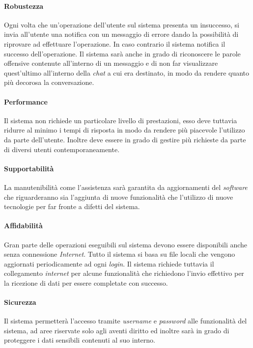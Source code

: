 \paragraph{Robustezza\\} 
Ogni volta che un’operazione dell’utente sul sistema presenta un insuccesso, si invia all’utente una notifica con un messaggio di errore dando la possibilità di riprovare ad effettuare l’operazione. In caso contrario il sistema notifica il successo dell’operazione. 
Il sistema sarà anche in grado di riconoscere le parole offensive contenute all’interno di un messaggio e di non far visualizzare quest’ultimo all’interno della \emph{chat} a cui era destinato, in modo da rendere quanto più decorosa la conversazione. 

\paragraph{Performance\\} 
Il sistema non richiede un particolare livello di prestazioni, esso deve tuttavia ridurre al minimo i tempi di risposta in modo da rendere più piacevole l’utilizzo da parte dell’utente. Inoltre deve essere in grado di gestire più richieste da parte di diversi utenti contemporaneamente.

\paragraph{Supportabilità\\} 
La manutenibilità come l’assistenza sarà garantita da aggiornamenti del \emph{software} che riguarderanno sia l’aggiunta di nuove funzionalità che l'utilizzo di nuove tecnologie per far fronte a difetti del sistema.

\paragraph{Affidabilità\\} 
Gran parte delle operazioni eseguibili sul sistema devono essere disponibili anche senza connessione \emph{Internet}. Tutto il sistema si basa su file locali che vengono aggiornati periodicamente ad ogni \emph{login}. Il sistema richiede tuttavia il collegamento \emph{internet} per alcune funzionalità che richiedono l’invio effettivo per la ricezione di dati per essere completate con successo.

\paragraph{Sicurezza\\} 
Il sistema permetterà l’accesso tramite \emph{username} e \emph{password} alle funzionalità del sistema, ad aree riservate solo agli aventi diritto ed inoltre sarà in grado di proteggere i dati sensibili contenuti al suo interno.

